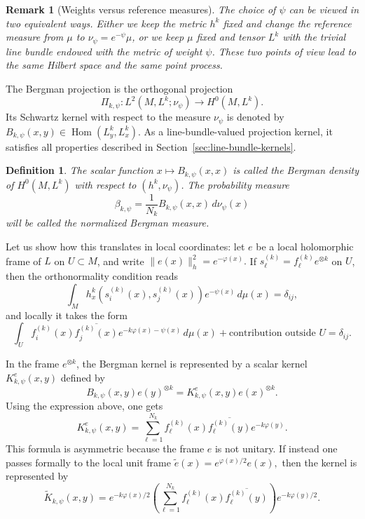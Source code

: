 \documentclass[12pt,a4paper,reqno]{article}
\theoremstyle{thmstyleone}
\theoremstyle{thmstylethree}
\newtheorem{definition}[theorem]{Definition}
\theoremstyle{thmstyletwo}
\newtheorem{remark}[theorem]{Remark}
\numberwithin{equation}{subsection}
\begin{document}
\begin{remark}[Weights versus reference measures]
The choice of $\psi$ can be viewed in two equivalent ways. Either we keep the metric $h^k$ fixed and change the reference measure from $\mu$ to $\nu_\psi=e^{-\psi}\mu$, or we keep $\mu$ fixed and tensor $L^k$ with the trivial line bundle endowed with the metric of weight $\psi$. These two points of view lead to the same Hilbert space and the same point process.
\end{remark}

The Bergman projection is the orthogonal projection
\[
    \Pi_{k,\psi}:L^2(M,L^k;\nu_\psi)
    \longrightarrow
    H^0(M,L^k).
\]
Its Schwartz kernel with respect to the measure $\nu_\psi$ is denoted by $B_{k,\psi}(x,y)\in \operatorname{Hom}(L_y^k,L_x^k).$ As a line-bundle-valued projection kernel, it satisfies all properties described in Section~\ref{sec:line-bundle-kernels}.


\begin{definition}
The scalar function $x\longmapsto B_{k,\psi}(x,x)$ is called the \emph{Bergman density} of $H^0(M,L^k)$ with respect to $(h^k,\nu_\psi)$. The probability measure
\[
    \beta_{k,\psi}
    =
    \frac{1}{N_k}B_{k,\psi}(x,x)\,d\nu_\psi(x)
\]
will be called the \emph{normalized Bergman measure}.
\end{definition}

Let us show how this translates in local coordinates: let $e$ be a local holomorphic frame of $L$ on $U\subset M$, and write $\|e(x)\|_h^2=e^{-\varphi(x)}.$ If $s_\ell^{(k)}=f_\ell^{(k)}e^{\otimes k}$ on $U$, then the orthonormality condition reads
\[
    \int_M
    h_x^k(s_i^{(k)}(x),s_j^{(k)}(x))e^{-\psi(x)}\,d\mu(x)
    =
    \delta_{ij},
\]
and locally it takes the form
\[
    \int_U
    f_i^{(k)}(x)\overline{f_j^{(k)}(x)}
    e^{-k\varphi(x)-\psi(x)}
    \,d\mu(x)
    +\text{contribution outside }U
    =
    \delta_{ij}.
\]

In the frame $e^{\otimes k}$, the Bergman kernel is represented by a scalar kernel $K_{k,\psi}^e(x,y)$ defined by
\[
    B_{k,\psi}(x,y)e(y)^{\otimes k}
    =
    K_{k,\psi}^e(x,y)e(x)^{\otimes k}.
\]
Using the expression above, one gets
\[
    K_{k,\psi}^e(x,y)
    =
    \sum_{\ell=1}^{N_k}
    f_\ell^{(k)}(x)\overline{f_\ell^{(k)}(y)}e^{-k\varphi(y)}.
\]
This formula is asymmetric because the frame $e$ is not unitary. If instead one passes formally to the local unit frame $\widetilde e(x)=e^{\varphi(x)/2}e(x),$ then the kernel is represented by
\[
    \widetilde K_{k,\psi}(x,y)
    =
    e^{-k\varphi(x)/2}
    \left(
        \sum_{\ell=1}^{N_k}
        f_\ell^{(k)}(x)\overline{f_\ell^{(k)}(y)}
    \right)
    e^{-k\varphi(y)/2}.
\]
\end{document}
